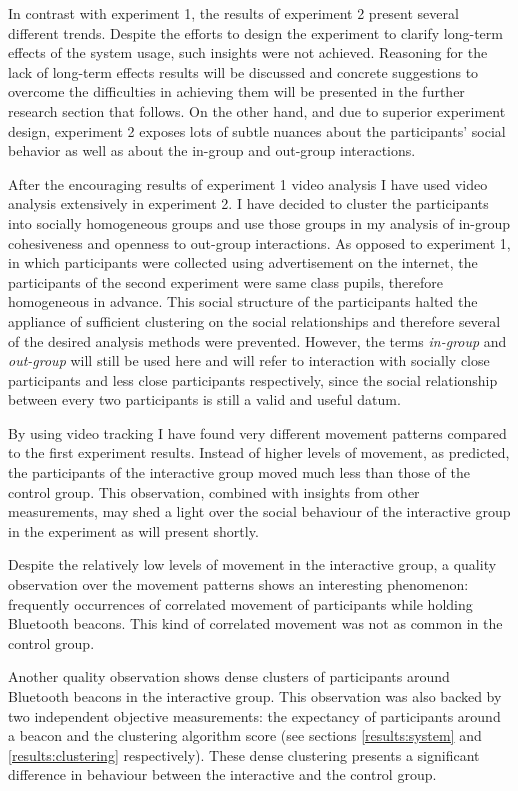 \documentclass[a4paper,11pt]{article}
\newcommand{\definition}[1]{\emph{#1}}
\begin{document}
{In contrast with experiment 1, the results of experiment 2 present several different trends.
Despite the efforts to design the experiment to clarify long-term effects of the system usage, such insights were not achieved.
Reasoning for the lack of long-term effects results will be discussed and concrete suggestions to overcome the difficulties in achieving them will be presented in the further research section that follows.
On the other hand, and due to superior experiment design, experiment 2 exposes lots of subtle nuances about the participants' social behavior as well as about the in-group and out-group interactions.

After the encouraging results of experiment 1 video analysis I have used video analysis extensively in experiment 2.
I have decided to cluster the participants into socially homogeneous groups and use those groups in my analysis of in-group cohesiveness and openness to out-group interactions.
As opposed to experiment 1, in which participants were collected using advertisement on the internet, the participants of the second experiment were same class pupils, therefore homogeneous in advance.
This social structure of the participants halted the appliance of sufficient clustering on the social relationships and therefore several of the desired analysis methods were prevented.
However, the terms \definition{in-group} and \definition{out-group} will still be used here and will refer to interaction with socially close participants and less close participants respectively, since the social relationship between every two participants is still a valid and useful datum.

By using video tracking I have found very different movement patterns compared to the first experiment results.
Instead of higher levels of movement, as predicted, the participants of the interactive group moved much less than those of the control group.
This observation, combined with insights from other measurements, may shed a light over the social behaviour of the interactive group in the experiment as will present shortly.

Despite the relatively low levels of movement in the interactive group, a quality observation over the movement patterns shows an interesting phenomenon: frequently occurrences of correlated movement of participants while holding Bluetooth beacons.
This kind of correlated movement was not as common in the control group.

Another quality observation shows dense clusters of participants around Bluetooth beacons in the interactive group.
This observation was also backed by two independent objective measurements: the expectancy of participants around a beacon and the clustering algorithm score (see sections \ref{results:system} and \ref{results:clustering} respectively).
These dense clustering presents a significant difference in behaviour between the interactive and the control group.

}
\end{document}
